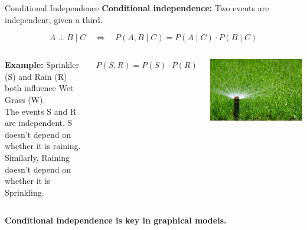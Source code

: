 \documentclass[handout,aspectratio=169]{beamer}
\begin{document}
\begin{frame}{Conditional Independence}
  \textbf{Conditional independence:} Two events are independent, given a third.

  \vspace{1em}
  \[
    A \perp B \mid C \quad \Leftrightarrow \quad P(A, B \mid C) = P(A \mid C) \cdot P(B \mid C)
  \]

  \vspace{1em}
  \begin{columns}
\textbf{Example:} Sprinkler (S) and Rain (R) both influence Wet Grass (W).\\
  The events S and R are independent. S doesn't depend on whether it is raining. Similarly, Raining doesn't depend on whether it is Sprinkling.

  \vspace{0.5em}
  $P(S,R) = P(S) \cdot P(R)$
  
    \includegraphics[width=\linewidth]{chapter_figs/01_figs/grass.jpg}
\end{columns}
  

  \vspace{1em}
  \textbf{Conditional independence is key in graphical models.}
\end{frame}
\end{document}
